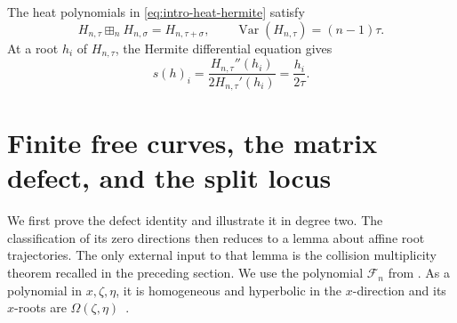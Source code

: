 \documentclass[12pt,reqno]{amsart}
\theoremstyle{definition}
\theoremstyle{remark}
\newcommand{\Var}{\operatorname{Var}}
\begin{document}
The heat polynomials in \eqref{eq:intro-heat-hermite} satisfy
\begin{equation}\label{eq:hermite-semigroup}
 H_{n,\tau}\boxplus_nH_{n,\sigma}=H_{n,\tau+\sigma},
 \qquad \Var(H_{n,\tau})=(n-1)\tau.
\end{equation}
At a root \(h_i\) of \(H_{n,\tau}\), the Hermite differential equation
gives
\begin{equation}\label{eq:hermite-score}
 s(h)_i=\frac{H_{n,\tau}''(h_i)}{2H_{n,\tau}'(h_i)}
 =\frac{h_i}{2\tau}.
\end{equation}


\section{Finite free curves, the matrix defect, and the split locus}
\label{sec:matrix-defect}

We first prove the defect identity and illustrate it in degree two.  The
classification of its zero directions then reduces to a lemma about affine
root trajectories.  The only external input to that lemma is the collision
multiplicity theorem recalled in the preceding section. We use the polynomial \(\mathcal F_n\) from .  As a polynomial in \(x,\zeta,\eta\), it is homogeneous and hyperbolic in the \(x\)-direction and its \(x\)-roots are \(\Omega(\zeta,\eta)\)~\cite[Proposition~1.6]{LeakeRyder18}.
\end{document}
